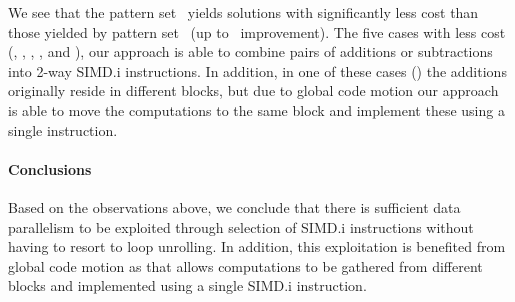We see that the \gls{pattern set}~ yields \glspl{solution}
with significantly less cost than those yielded by \gls{pattern
  set}~ (up to~\printZCNorm{%
  \SimdVsWithoutCyclesSpeedupCyclesZeroCenteredSpeedupMax%
} improvement).
%
The five cases with less cost (,
, , , and
), our approach is able to combine pairs of additions or
subtractions into \num{2}-way \gls{SIMD.i} \glspl{instruction}.
%
In addition, in one of these cases () the additions
originally reside in different \glspl{block}, but due to \gls{global code
  motion} our approach is able to move the computations to the same \gls{block}
and implement these using a single \gls{instruction}.


\paragraph{Conclusions}

Based on the observations above, we conclude that there is sufficient data
parallelism to be exploited through selection of \gls{SIMD.i}
\glspl{instruction} without having to resort to \gls{loop unrolling}.
%
In addition, this exploitation is benefited from \gls{global code motion} as
that allows computations to be gathered from different \glspl{block} and
implemented using a single \gls{SIMD.i} \gls{instruction}.
